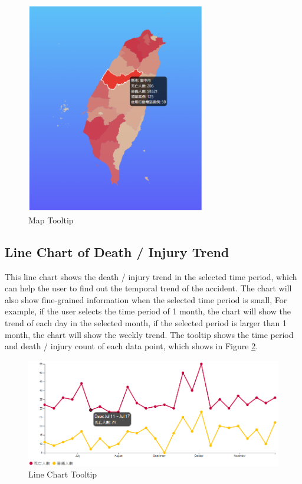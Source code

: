 \documentclass[a4paper, oneside, final, 12pt]{scrartcl} %
\begin{document}
\begin{figure}[htbp]
  \centering
  \includegraphics[width=0.7\textwidth]{"./Image/map_tooltip.png"}
  \caption{Map Tooltip}
  \label{fig: map_tooltip}
\end{figure}

\subsection{Line Chart of Death / Injury Trend}

This line chart shows the death / injury trend in the selected time period,
which can help the user to find out the temporal trend of the accident.
The chart will also show fine-grained information when the selected time period is small,
For example, if the user selects the time period of 1 month,
the chart will show the trend of each day in the selected month,
if the selected period is larger than 1 month,
the chart will show the weekly trend.
The tooltip shows the time period and death / injury count of each data point,
which shows in Figure \ref{fig: line_tooltip}.

\begin{figure}[htbp]
  \centering
  \includegraphics[width=1.0\textwidth]{"./Image/line_tooltip.png"}
  \caption{Line Chart Tooltip}
  \label{fig: line_tooltip}
\end{figure}
\end{document}
